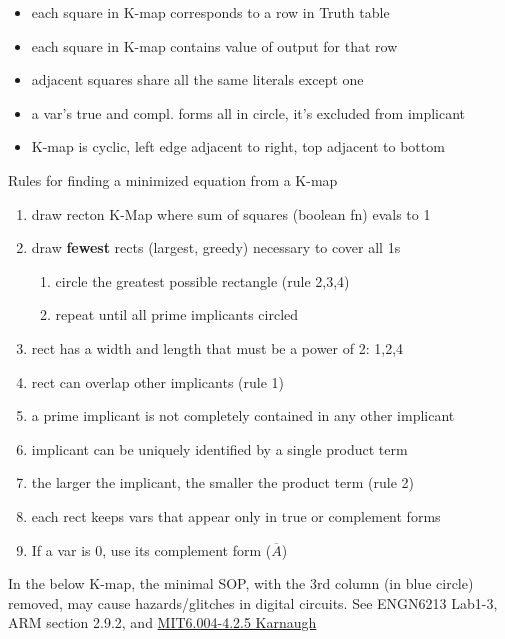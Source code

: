 \begin{itemize}
\item each square in K-map corresponds to a row in Truth table
\item each square in K-map contains value of output for that row
\item adjacent squares share all the same literals except one
\item a var's true and compl. forms all in circle, it's excluded from implicant
\item K-map is cyclic, left edge adjacent to right,  top adjacent to bottom
\end{itemize}

Rules for finding a minimized equation from a K-map
\begin{enumerate}
\item draw recton K-Map where sum of squares (boolean fn) evals to 1
\item draw \textbf{fewest} rects (largest, greedy) necessary to cover all 1s
  \begin{enumerate}
  \item circle the greatest possible rectangle (rule 2,3,4)
  \item repeat until all prime implicants circled
  \end{enumerate}
\item rect has a width and length that must be a power of 2: 1,2,4
\item rect can overlap other implicants (rule 1)
\item a prime implicant is not completely contained in any other implicant
\item implicant can be uniquely identified by a single product term
\item the larger the implicant, the smaller the product term (rule 2)
\item each rect keeps vars that appear only in true or complement forms
\item If a var is 0, use its complement form ($\overline{A}$)
\end{enumerate}
In the below K-map, the minimal SOP, with the 3rd column (in blue circle) removed, may cause
hazards/glitches in digital circuits. See ENGN6213 Lab1-3, ARM section 2.9.2, and \href{https://ocw.mit.edu/courses/6-004-computation-structures-spring-2017/pages/c4/c4s2/c4s2v5/}{MIT6.004-4.2.5 Karnaugh}


